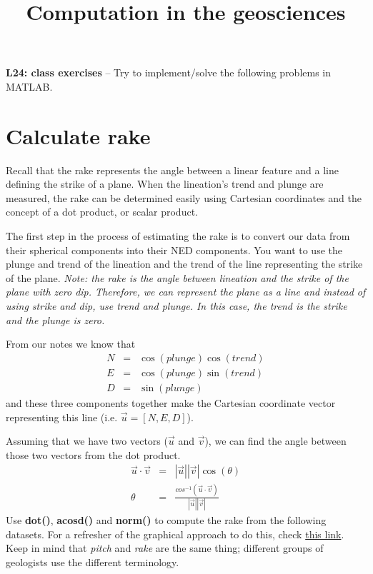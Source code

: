 \documentclass[10pt,fleqn]{article}
\title{Computation in the geosciences}
\date{\empty}
\begin{document}
\textbf{L24: class exercises} -- Try to implement/solve the following problems in MATLAB.

\section*{Calculate rake}

Recall that the rake represents the angle between a linear feature and a line defining the strike of a plane.  When the lineation’s trend and plunge are measured, the rake can be determined easily using Cartesian coordinates and the concept of a dot product, or scalar product. 

The first step in the process of estimating the rake is to convert our data from their spherical components into their NED components. You want to use the plunge and trend of the lineation and the trend of the line representing the strike of the plane. \textit{Note: the rake is the angle between lineation and the strike of the plane with zero dip. Therefore, we can represent the plane as a line and instead of using strike and dip, use trend and plunge. In this case, the trend is the strike and the plunge is zero.}

From our notes we know that 
\begin{eqnarray}
  N &=& \cos(plunge)\cos(trend) \\
  E &=& \cos(plunge)\sin(trend) \\
  D &=& \sin(plunge)
\end{eqnarray}
and these three components together make the Cartesian coordinate vector representing this line (i.e. $\vec{u}=[N, E, D]$).

Assuming that we have two vectors ($\vec{u}$ and $\vec{v}$), we can find the angle between those two vectors from the dot product.
\begin{eqnarray} \nonumber
  \vec{u}\cdot\vec{v} &=& |\vec{u}||\vec{v}|\cos(\theta) \\ \nonumber
  \theta &=& \frac{cos^{-1}(\vec{u}\cdot\vec{v})}{|\vec{u}||\vec{v}|}
\end{eqnarray}
Use \textbf{dot()}, \textbf{acosd()} and \textbf{norm()} to compute the rake from the following datasets. For a refresher of the graphical approach to do this, check \href{https://www.uwgb.edu/dutchs/structge/SL85FindPitch.HTM}{this link}. Keep in mind that \textit{pitch} and \textit{rake} are the same thing; different groups of geologists use the different terminology.
\end{document}
